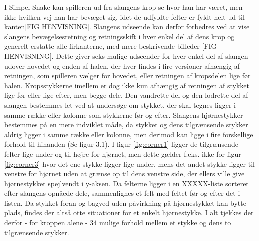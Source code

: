\documentclass{report}
\begin{document}
I Simpel Snake kan spilleren ud fra slangens krop se hvor han har været, men ikke hvilken vej han har bevæget sig, idet de udfyldte felter er fyldt helt ud til kanten[FIG HENVISNING]. Slangens udseende kan derfor forbedres ved at vise slangens bevægelsesretning og retningsskift i hver enkel del af dens krop og generelt erstatte alle firkanterne, med mere beskrivende billeder [FIG HENVISNING]. Dette giver seks mulige udseender for hver enkel del af slangen udover hovedet og enden af halen, der hver findes i fire versioner afhængig af retningen, som spilleren vælger for hovedet, eller retningen af kropsdelen lige før halen. Kropsstykkerne imellem er dog ikke kun afhængig af retningen af stykket lige før eller lige efter, men begge dele. Den vandrette del og den lodrette del af slangen bestemmes let ved at undersøge om stykket, der skal tegnes ligger i samme række eller kolonne som stykkerne før og efter. Slangens hjørnestykker bestemmes på en mere indviklet måde, da stykket og dens tilgrænsende stykker aldrig ligger i samme række eller kolonne, men derimod kan ligge i fire forskellige forhold til hinanden (Se figur 3.1). I figur \ref{fig:corner1} ligger de tilgrænsende felter lige under og til højre for hjørnet, men dette gælder f.eks. ikke for figur \ref{fig:corner3} hvor det ene stykke ligger lige under, mens det andet stykke ligger til venstre for hjørnet uden at grænse op til dens venstre side, der ellers ville give hjørnestykket spejlvendt i y-aksen. Da felterne ligger i en XXXXX-liste sorteret efter slangens opnåede dele, sammenlignes et felt med feltet før og efter det i listen. Da stykket foran og bagved uden påvirkning på hjørnestykket kan bytte plads, findes der altså otte situationer for et enkelt hjørnestykke. I alt tjekkes der derfor - for kroppen alene - 34 mulige forhold mellem et stykke og dens to tilgrænsende stykker.
\linebreak
\end{document}

